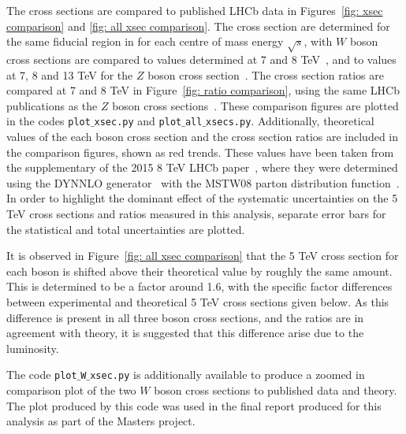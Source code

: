 \documentclass[a4paper,12pt]{article}
\begin{document}
The cross sections are compared to published LHCb data in Figures~\ref{fig: xsec comparison} and \ref{fig: all xsec comparison}. The cross section are determined for the same fiducial region in for each centre of mass energy $\sqrt{s}$, with $W$ boson cross sections are compared to values determined at 7 and 8 TeV~\cite{7TeV_Z_2015,8TeV_W+Z_2015}, and to values at 7, 8 and 13 TeV for the $Z$ boson cross section~\cite{7TeV_Z_2015,8TeV_W+Z_2015,13TeV_Z_2016}.
The cross section ratios are compared at 7 and 8 TeV in Figure~\ref{fig: ratio comparison}, using the same LHCb publications as the $Z$ boson cross sections~\cite{7TeV_Z_2015,8TeV_W+Z_2015}.
These comparison figures are plotted in the codes \texttt{plot$\_$xsec.py} and \texttt{plot$\_$all$\_$xsecs.py}. 
Additionally, theoretical values of the each boson cross section and the cross section ratios are included in the comparison figures, shown as red trends. These values have been taken from the supplementary of the 2015 8 TeV LHCb paper~\cite{8TeV_W+Z_2015}, where they were determined using the DYNNLO generator~\cite{DYNNLO} with the MSTW08 parton distribution function~\cite{MSTW08}.
In order to highlight the dominant effect of the systematic uncertainties on the 5 TeV cross sections and ratios measured in this analysis, separate error bars for the statistical and total uncertainties are plotted. 

It is observed in Figure~\ref{fig: all xsec comparison} that the 5 TeV cross section for each boson is shifted above their theoretical value by roughly the same amount. This is determined to be a factor around 1.6, with the specific factor differences between experimental and theoretical 5 TeV cross sections given below. As this difference is present in all three boson cross sections, and the ratios are in agreement with theory, it is suggested that this difference arise due to the luminosity.



The code \texttt{plot$\_$W$\_$xsec.py} is additionally available to produce a zoomed in comparison plot of the two $W$ boson cross sections to published data and theory. The plot produced by this code was used in the final report produced for this analysis as part of the Masters project.
\end{document}
